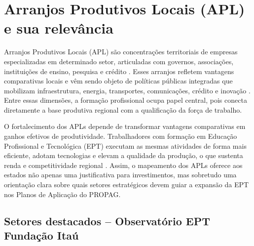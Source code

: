 \section{Arranjos Produtivos Locais (APL) e sua relevância}

Arranjos Produtivos Locais (APL) são concentrações territoriais de empresas especializadas em determinado setor, articuladas com governos, associações, instituições de ensino, pesquisa e crédito \parencite{redeSist_guia, sebrae_apl}. Esses arranjos refletem vantagens comparativas locais e vêm sendo objeto de políticas públicas integradas que mobilizam infraestrutura, energia, transportes, comunicações, crédito e inovação \parencite{mdic_mapeamento_apl}. Entre essas dimensões, a formação profissional ocupa papel central, pois conecta diretamente a base produtiva regional com a qualificação da força de trabalho.

O fortalecimento dos APLs depende de transformar vantagens comparativas em ganhos efetivos de produtividade. Trabalhadores com formação em Educação Profissional e Tecnológica (EPT) executam as mesmas atividades de forma mais eficiente, adotam tecnologias e elevam a qualidade da produção, o que sustenta renda e competitividade regional \parencite{lastres_cassiolato}. Assim, o mapeamento dos APLs oferece aos estados não apenas uma justificativa para investimentos, mas sobretudo uma orientação clara sobre quais setores estratégicos devem guiar a expansão da EPT nos Planos de Aplicação do PROPAG.


\subsection{Setores destacados – Observatório EPT Fundação Itaú}

